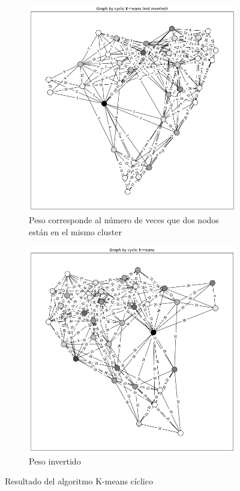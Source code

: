 \documentclass[12pt,a4paper]{article}
\begin{document}
\begin{figure}[H]
\centering
\begin{subfigure}{.5\textwidth}
  \centering
  \includegraphics[width=.9\linewidth]{grafo kmeans ciclico}
  \caption{Peso corresponde al número de veces que dos nodos están en el mismo cluster}
  \label{fig:sub1}
\end{subfigure}%
\begin{subfigure}{.5\textwidth}
  \centering
  \includegraphics[width=.9\linewidth]{grafo kmeans ciclico invertido}
  \caption{Peso invertido\\ \phantom{filler}}
  \label{fig:sub2}
\end{subfigure}
\caption{Resultado del algoritmo K-means cíclico}
\label{fig:test}
\end{figure}
\end{document}
